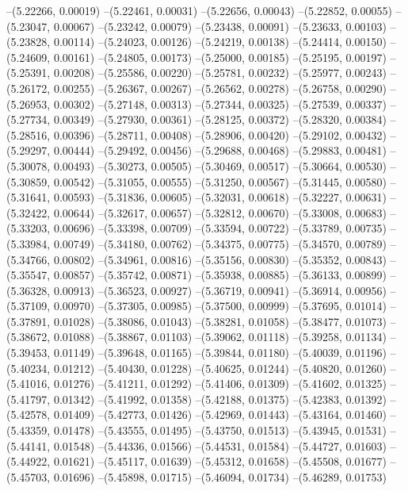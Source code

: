 --(5.22266, 0.00019)
--(5.22461, 0.00031)
--(5.22656, 0.00043)
--(5.22852, 0.00055)
--(5.23047, 0.00067)
--(5.23242, 0.00079)
--(5.23438, 0.00091)
--(5.23633, 0.00103)
--(5.23828, 0.00114)
--(5.24023, 0.00126)
--(5.24219, 0.00138)
--(5.24414, 0.00150)
--(5.24609, 0.00161)
--(5.24805, 0.00173)
--(5.25000, 0.00185)
--(5.25195, 0.00197)
--(5.25391, 0.00208)
--(5.25586, 0.00220)
--(5.25781, 0.00232)
--(5.25977, 0.00243)
--(5.26172, 0.00255)
--(5.26367, 0.00267)
--(5.26562, 0.00278)
--(5.26758, 0.00290)
--(5.26953, 0.00302)
--(5.27148, 0.00313)
--(5.27344, 0.00325)
--(5.27539, 0.00337)
--(5.27734, 0.00349)
--(5.27930, 0.00361)
--(5.28125, 0.00372)
--(5.28320, 0.00384)
--(5.28516, 0.00396)
--(5.28711, 0.00408)
--(5.28906, 0.00420)
--(5.29102, 0.00432)
--(5.29297, 0.00444)
--(5.29492, 0.00456)
--(5.29688, 0.00468)
--(5.29883, 0.00481)
--(5.30078, 0.00493)
--(5.30273, 0.00505)
--(5.30469, 0.00517)
--(5.30664, 0.00530)
--(5.30859, 0.00542)
--(5.31055, 0.00555)
--(5.31250, 0.00567)
--(5.31445, 0.00580)
--(5.31641, 0.00593)
--(5.31836, 0.00605)
--(5.32031, 0.00618)
--(5.32227, 0.00631)
--(5.32422, 0.00644)
--(5.32617, 0.00657)
--(5.32812, 0.00670)
--(5.33008, 0.00683)
--(5.33203, 0.00696)
--(5.33398, 0.00709)
--(5.33594, 0.00722)
--(5.33789, 0.00735)
--(5.33984, 0.00749)
--(5.34180, 0.00762)
--(5.34375, 0.00775)
--(5.34570, 0.00789)
--(5.34766, 0.00802)
--(5.34961, 0.00816)
--(5.35156, 0.00830)
--(5.35352, 0.00843)
--(5.35547, 0.00857)
--(5.35742, 0.00871)
--(5.35938, 0.00885)
--(5.36133, 0.00899)
--(5.36328, 0.00913)
--(5.36523, 0.00927)
--(5.36719, 0.00941)
--(5.36914, 0.00956)
--(5.37109, 0.00970)
--(5.37305, 0.00985)
--(5.37500, 0.00999)
--(5.37695, 0.01014)
--(5.37891, 0.01028)
--(5.38086, 0.01043)
--(5.38281, 0.01058)
--(5.38477, 0.01073)
--(5.38672, 0.01088)
--(5.38867, 0.01103)
--(5.39062, 0.01118)
--(5.39258, 0.01134)
--(5.39453, 0.01149)
--(5.39648, 0.01165)
--(5.39844, 0.01180)
--(5.40039, 0.01196)
--(5.40234, 0.01212)
--(5.40430, 0.01228)
--(5.40625, 0.01244)
--(5.40820, 0.01260)
--(5.41016, 0.01276)
--(5.41211, 0.01292)
--(5.41406, 0.01309)
--(5.41602, 0.01325)
--(5.41797, 0.01342)
--(5.41992, 0.01358)
--(5.42188, 0.01375)
--(5.42383, 0.01392)
--(5.42578, 0.01409)
--(5.42773, 0.01426)
--(5.42969, 0.01443)
--(5.43164, 0.01460)
--(5.43359, 0.01478)
--(5.43555, 0.01495)
--(5.43750, 0.01513)
--(5.43945, 0.01531)
--(5.44141, 0.01548)
--(5.44336, 0.01566)
--(5.44531, 0.01584)
--(5.44727, 0.01603)
--(5.44922, 0.01621)
--(5.45117, 0.01639)
--(5.45312, 0.01658)
--(5.45508, 0.01677)
--(5.45703, 0.01696)
--(5.45898, 0.01715)
--(5.46094, 0.01734)
--(5.46289, 0.01753)
